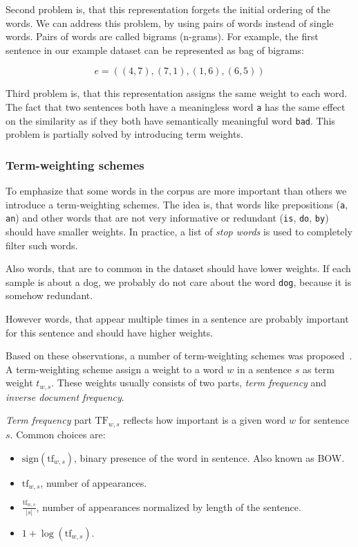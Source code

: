     Second problem is, that this representation forgets the initial ordering of the words.
    We can address this problem, by using pairs of words instead of single words. 
    Pairs of words are called bigrams (n-grams).
    For example, the first sentence in our example dataset can be represented as bag of bigrams:
    
    $$e = ((4,7),(7,1),(1,6),(6,5))$$
    
    Third problem is, that this representation assigns the same weight to each word.
    The fact that two sentences both have a meaningless word \texttt{a} has the same effect on the similarity as if they both have semantically meaningful word \texttt{bad}. 
    This problem is partially solved by introducing term weights.
    
    
    \subsubsection{Term-weighting schemes} \label{sec:term:weights}
    
    To emphasize that some words in the corpus are more important than others we introduce a term-weighting schemes. 
    The idea is, that words like prepositions (\texttt{a}, \texttt{an}) and other words that are not very informative or redundant (\texttt{is}, \texttt{do}, \texttt{by}) should have smaller weights. 
    In practice, a list of \textit{stop words} is used to completely filter such words.
    
    Also words, that are to common in the dataset should have lower weights.
    If each sample is about a dog, we probably do not care about the word \texttt{dog}, because it is somehow redundant.
    
    However words, that appear multiple times in a sentence are probably important for this sentence and should have higher weights.
    
    Based on these observations, a number of term-weighting schemes was proposed~\cite{salton1988term}.
    A term-weighting scheme assign a weight to a word $w$ in a sentence $s$ as term weight $t_{w,s}$.
    These weights usually consists of two parts, \emph{term frequency} and \emph{inverse document frequency}. 
    
    \emph{Term frequency} part $\mathrm{TF}_{w,s}$ reflects how important is a given word $w$ for sentence $s$.
    Common choices are:
    \begin{itemize}
        \item $\mathrm{sign}(\mathrm{tf}_{w,s})$, binary presence of the word in sentence. Also known as BOW.
        \item $\mathrm{tf}_{w,s}$, number of appearances.
        \item $\frac{\mathrm{tf}_{w,s}}{|s|}$, number of appearances normalized by length of the sentence.
        \item $1+\log(\mathrm{tf}_{w,s})$.
    \end{itemize}
    
